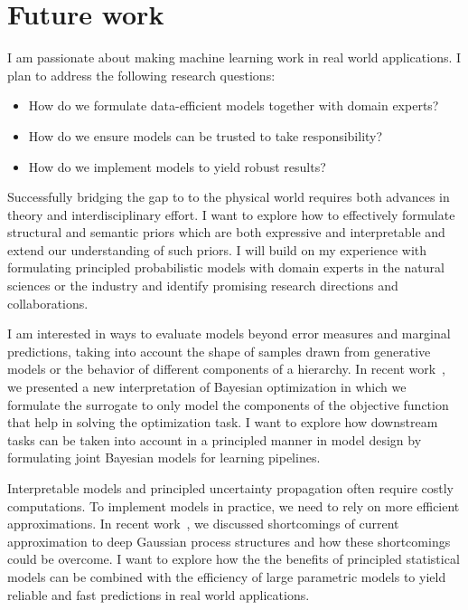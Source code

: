 \section{Future work}
\label{toc:discussion:future_work}
I am passionate about making machine learning work in real world applications.
I plan to address the following research questions:
\begin{itemize}
    \item How do we formulate data-efficient models together with domain experts?
    \item How do we ensure models can be trusted to take responsibility?
    \item How do we implement models to yield robust results?
\end{itemize}
Successfully bridging the gap to to the physical world requires both advances in theory and interdisciplinary effort.
I want to explore how to effectively formulate structural and semantic priors which are both expressive and interpretable and extend our understanding of such priors.
I will build on my experience with formulating principled probabilistic models with domain experts in the natural sciences or the industry and identify promising research directions and collaborations.

I am interested in ways to evaluate models beyond error measures and marginal predictions, taking into account the shape of samples drawn from generative models or the behavior of different components of a hierarchy.
In recent work~\parencite{bodin_modulating_2020}, we presented a new interpretation of Bayesian optimization in which we formulate the surrogate to only model the components of the objective function that help in solving the optimization task.
I want to explore how downstream tasks can be taken into account in a principled manner in model design by formulating joint Bayesian models for learning pipelines.

Interpretable models and principled uncertainty propagation often require costly computations.
To implement models in practice, we need to rely on more efficient approximations.
In recent work~\parencite{ustyuzhaninov_compositional_2020}, we discussed shortcomings of current approximation to deep Gaussian process structures and how these shortcomings could be overcome.
I want to explore how the the benefits of principled statistical models can be combined with the efficiency of large parametric models to yield reliable and fast predictions in real world applications.

